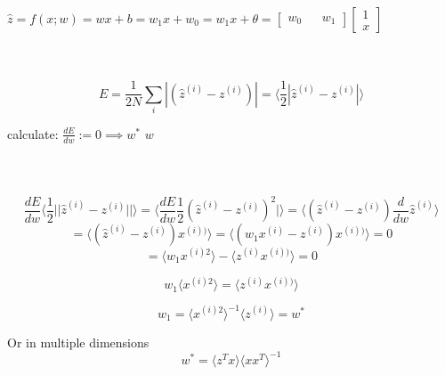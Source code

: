 \documentclass{article}
\begin{document}
$
\hat{z} = f(x;w) = wx + b = w_{1}x + w_{0} = w_{1}x + \theta =
\begin{bmatrix}
 w_{0} && w_{1} 
\end{bmatrix}
\begin{bmatrix}
  1\\
  x
\end{bmatrix}
$


\\\\


$$E = \frac{1}{2N}\sum_i|(\hat{z}^{(i)}-z^{(i)})| =  \langle \frac{1}{2}|\hat{z}^{(i)}-z^{(i)}|  \rangle   $$


calculate: $\frac{dE}{dw}:=0 \implies w^*$ $w$\\\\

\\\\


$$\frac{dE}{dw}\langle \frac{1}{2}||\hat{z}^{(i)}-z^{(i)}|| \rangle = \langle \frac{dE}{dw}\frac{1}{2}( \hat{z}^{(i)}-z^{(i)})^2 | \rangle = \langle(\hat{z}^{(i)}-z^{(i)})\frac{d}{dw}\hat{z}^{(i)} \rangle $$
$$ = \langle(\hat{z}^{(i)}-z^{(i)})x^{(i))} \rangle = \langle (w_1x^{(i)}-z^{(i)})x^{(i))} \rangle = 0$$
$$ = \langle w_1x^{(i)2} \rangle - \langle z^{(i)}x^{(i))} \rangle = 0$$

$$ w_1\langle x^{(i)2} \rangle = \langle z^{(i)}x^{(i))} \rangle $$

$$ w_1 = \langle x^{(i)2} \rangle ^{-1} \langle z^{(i)} \rangle = w^*$$

Or in multiple dimensions\\
$$ w^* = \langle z^Tx \rangle \langle xx^T \rangle ^{-1}$$
\end{document}
